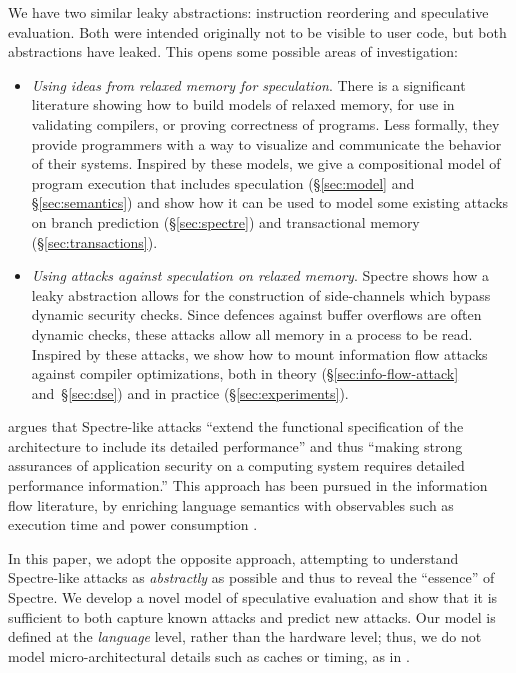 We have two similar leaky abstractions: instruction reordering
and speculative evaluation. Both were intended originally not to
be visible to user code, but both abstractions have leaked.
This opens some possible areas of investigation:
\begin{itemize}

\item \emph{Using ideas from relaxed memory for speculation}.
  There is a significant literature showing how to build models of
  relaxed memory, for use in validating compilers, or proving
  correctness of programs.  Less formally, they provide programmers
  with a way to visualize and communicate the behavior of their
  systems.  Inspired by these models, we give a compositional model of
  program execution that includes speculation (\S\ref{sec:model} and
  \S\ref{sec:semantics}) and show how it can be used to model some
  existing attacks on branch prediction (\S\ref{sec:spectre}) and
  transactional memory (\S\ref{sec:transactions}).

\item \emph{Using attacks against speculation on relaxed memory}.
  Spectre shows how a leaky abstraction allows for the construction of
  side-channels which bypass dynamic security checks. Since defences
  against buffer overflows are often dynamic checks, these attacks
  allow all memory in a process to be read.  Inspired by these
  attacks, we show how to mount information flow attacks against
  compiler optimizations, both in theory (\S\ref{sec:info-flow-attack}
  and~\S\ref{sec:dse}) and in practice (\S\ref{sec:experiments}).

\end{itemize}
\citet{Chien:2018} argues that Spectre-like attacks ``extend the functional
specification of the architecture to include its detailed performance'' and
thus ``making strong assurances of application security on a computing system
requires detailed performance information.''
This approach has been pursued in the information flow literature, by
enriching language semantics with observables such as execution time and  power consumption
\cite{Zhang:2012:LCM:2345156.2254078,hyperflow}.

In this paper, we adopt the opposite approach, attempting to understand
Spectre-like attacks as \emph{abstractly} as possible and thus to reveal the
``essence'' of Spectre.  We develop a novel model of speculative
evaluation and show that it is sufficient to both capture known attacks and
predict new attacks.  Our model is defined at the \emph{language} level,
rather than the hardware level; thus, we do not model micro-architectural
details such as caches or timing, as in
\cite{Zhang:2012:LCM:2345156.2254078,hyperflow}.

